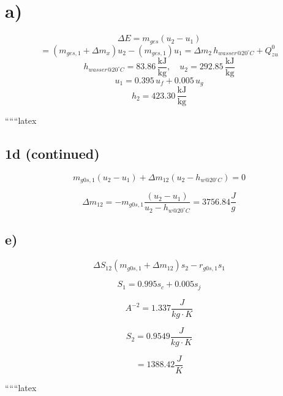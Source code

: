 \section*{a)}
\begin{equation*}
\Delta E = m_{ges} \left( u_2 - u_1 \right)
\end{equation*}
\begin{equation*}
= \left( m_{ges,1} + \Delta m_x \right) u_2 - \left( m_{ges,1} \right) u_1 = \Delta m_2 \, h_{wasser@20^\circ C} + Q_{zu}^0
\end{equation*}
\begin{equation*}
h_{wasser@20^\circ C} = 83.86 \, \frac{\text{kJ}}{\text{kg}}, \quad u_2 = 292.85 \, \frac{\text{kJ}}{\text{kg}}
\end{equation*}
\begin{equation*}
u_1 = 0.395 \, u_f + 0.005 \, u_g
\end{equation*}
\begin{equation*}
h_2 = 423.30 \, \frac{\text{kJ}}{\text{kg}}
\end{equation*}

``````latex

\subsection*{1d (continued)}

\begin{equation*}
m_{g0s,1} (u_2 - u_1) + \Delta m_{12} (u_2 - h_{w@20^\circ C}) = 0
\end{equation*}

\begin{equation*}
\Delta m_{12} = -m_{g0s,1} \frac{(u_2 - u_1)}{u_2 - h_{w@20^\circ C}} = 3756.84 \frac{J}{g}
\end{equation*}

\subsection*{e)}

\begin{equation*}
\Delta S_{12} \left( m_{g0s,1} + \Delta m_{12} \right) s_2 - r_{g0s,1} s_1
\end{equation*}

\begin{equation*}
S_1 = 0.995 s_c + 0.005 s_j
\end{equation*}

\begin{equation*}
A^{-2} = 1.337 \frac{J}{kg \cdot K}
\end{equation*}

\begin{equation*}
S_2 = 0.9549 \frac{J}{kg \cdot K}
\end{equation*}

\begin{equation*}
= 1388.42 \frac{J}{K}
\end{equation*}

``````latex


